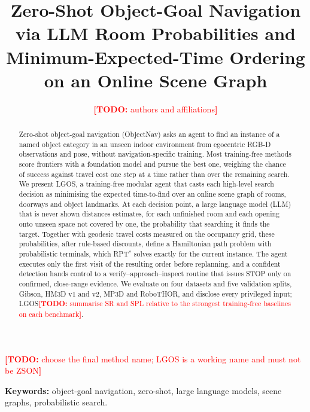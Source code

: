 \documentclass[10pt]{article}
\newcommand{\TODO}[1]{\textcolor{red}{\textbf{[TODO:} #1\textbf{]}}}
\newcommand{\ours}{LGOS\xspace}
\begin{document}

\title{Zero-Shot Object-Goal Navigation via LLM Room Probabilities and Minimum-Expected-Time Ordering on an Online Scene Graph}
\author{\TODO{authors and affiliations}}
\date{}
\maketitle
\noindent\TODO{choose the final method name; \ours is a working name and must not be ZSON}

\begin{abstract}
Zero-shot object-goal navigation (ObjectNav) asks an agent to find an instance of a named object category in an unseen indoor environment from egocentric RGB-D observations and pose, without navigation-specific training. Most training-free methods score frontiers with a foundation model and pursue the best one, weighing the chance of success against travel cost one step at a time rather than over the remaining search. We present \ours, a training-free modular agent that casts each high-level search decision as minimising the expected time-to-find over an online scene graph of rooms, doorways and object landmarks. At each decision point, a large language model (LLM) that is never shown distances estimates, for each unfinished room and each opening onto unseen space not covered by one, the probability that searching it finds the target. Together with geodesic travel costs measured on the occupancy grid, these probabilities, after rule-based discounts, define a Hamiltonian path problem with probabilistic terminals, which RPT$^*$ solves exactly for the current instance. The agent executes only the first visit of the resulting order before replanning, and a confident detection hands control to a verify--approach--inspect routine that issues STOP only on confirmed, close-range evidence. We evaluate on four datasets and five validation splits, Gibson, HM3D v1 and v2, MP3D and RoboTHOR, and disclose every privileged input; \ours \TODO{summarise SR and SPL relative to the strongest training-free baselines on each benchmark}.
\end{abstract}

\noindent\textbf{Keywords:} object-goal navigation, zero-shot, large language models, scene graphs, probabilistic search.
\end{document}
